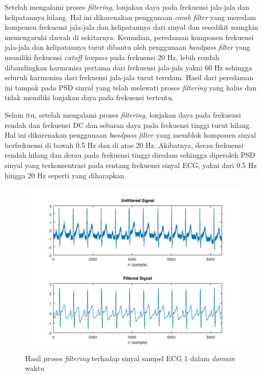 \documentclass[11pt]{article}
\begin{document}
Setelah mengalami proses \textit{filtering}, lonjakan daya pada frekuensi jala-jala dan kelipatannya hilang. Hal ini dikarenakan penggunaan \textit{comb filter} yang meredam komponen frekuensi jala-jala dan kelipatannya dari sinyal dan sesedikit mungkin memengaruhi daerah di sekitarnya. Kemudian, peredaman komponen frekuensi jala-jala dan kelipatannya turut dibantu oleh penggunaan \textit{bandpass filter} yang memiliki frekuensi \textit{cutoff} \textit{lowpass} pada frekuensi 20 Hz, lebih rendah dibandingkan harmonisa pertama dari frekuensi jala-jala yakni 60 Hz sehingga seluruh harmonisa dari frekuensi jala-jala turut teredam. Hasil dari peredaman ini tampak pada PSD sinyal yang telah melewati proses \textit{filtering} yang halus dan tidak memiliki lonjakan daya pada frekuensi tertentu.

Selain itu, setelah mengalami proses \textit{filtering}, lonjakan daya pada frekuensi rendah dan frekuensi DC dan sebaran daya pada frekuensi tinggi turut hilang.  Hal ini dikarenakan penggunaan \textit{bandpass filter} yang memblok komponen sinyal berfrekuensi di bawah 0.5 Hz dan di atas 20 Hz. Akibatnya, derau frekuensi rendah hilang dan derau pada frekuensi tinggi diredam sehingga diperoleh PSD sinyal yang terkonsentrasi pada rentang frekuensi sinyal ECG, yakni dari 0.5 Hz hingga 20 Hz seperti yang diharapkan.

\begin{figure}[H]
\centerline{\includegraphics[scale=0.55]{figures/fig21-ecg1filteredtime.png}}
\caption{Hasil proses \textit{filtering} terhadap sinyal sampel ECG 1 dalam \textit{domain} waktu}
\label{ecg1filteredtime}
\end{figure}
\end{document}
